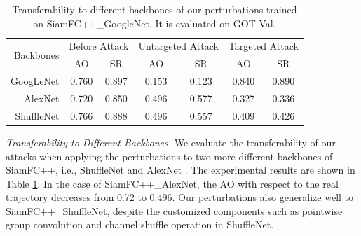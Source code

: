 \documentclass[journal]{IEEEtran}
\newcommand{\ie}{i.e.}
\begin{document}
\begin{table}[t]
  \centering
  \caption{Transferability to different backbones of our perturbations trained on SiamFC++\_GoogleNet. It is evaluated on GOT-Val.}
  \begin{tabular}{rcccccc} 
  \toprule
  \multirow{2}{*}[-2pt]{Backbones} & \multicolumn{2}{c}{Before Attack} & \multicolumn{2}{c}{Untargeted Attack} & \multicolumn{2}{c}{Targeted Attack}  \\ 
  \cmidrule{2-7}
                            & AO    & SR                           & AO    & SR                           & AO    & SR                           \\ 
  \midrule
  GoogLeNet                 & 0.760 & 0.897                        & 0.153 & 0.123                        & 0.840 & 0.890                        \\
  AlexNet                   & 0.720 & 0.850                        & 0.496 & 0.577                        & 0.327 & 0.336                        \\
  ShuffleNet                & 0.766 & 0.888                        & 0.496 & 0.557                        & 0.409 & 0.426                       \\
  \bottomrule
  \end{tabular}
  \label{tab:backbone}
\end{table}
\textit{Transferability to Different Backbones.} We evaluate the transferability of our attacks when applying the perturbations to two more different backbones of SiamFC++, \ie, ShuffleNet \cite{ShuffleNet} and AlexNet \cite{AlexNet}.
The experimental results are shown in Table \ref{tab:backbone}. In the case of SiamFC++\_AlexNet, the AO with respect to the real trajectory decreases from 0.72 to 0.496. 
Our perturbations also generalize well to SiamFC++\_ShuffleNet, despite the customized components such as pointwise group convolution and channel shuffle operation in ShuffleNet.
\end{document}
